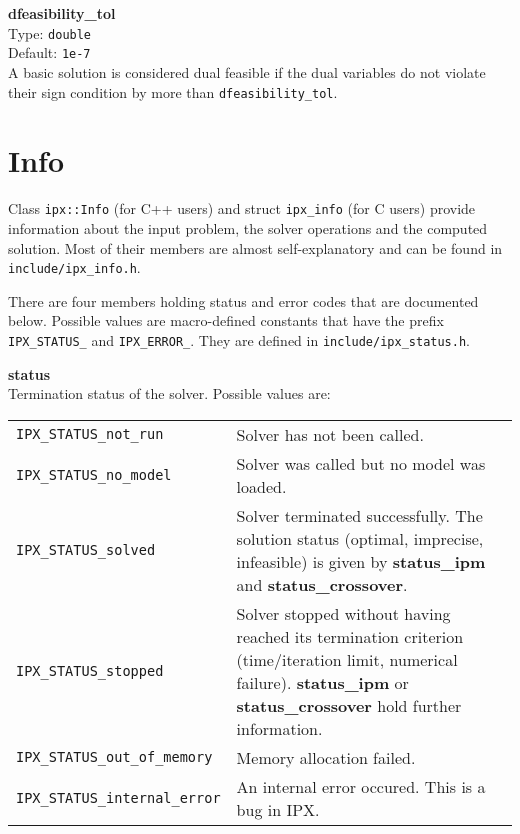 \documentclass{article}
\newcommand{\ct}{\texttt}
\newcommand{\param}[4]{
  \noindent\begin{minipage}{\textwidth}
    \textbf{#1}\\
    Type: \ct{#2}\\
    Default: \ct{#3}\\
    #4
  \end{minipage}
  \vskip 1\baselineskip
}
\newcommand{\info}[2]{
  \noindent\begin{minipage}{\textwidth}
    \textbf{#1}\\
    #2
  \end{minipage}
  \vskip 1\baselineskip
}
\begin{document}
\param{dfeasibility\_tol}{double}{1e-7}{
  A basic solution is considered dual feasible if the dual variables do not
  violate their sign condition by more than \ct{dfeasibility\_tol}.
}

\section{Info}
\label{sec:info}

Class \ct{ipx::Info} (for C++ users) and struct \ct{ipx\_info} (for C users)
provide information about the input problem, the solver operations and the
computed solution. Most of their members are almost self-explanatory and can be
found in \ct{include/ipx\_info.h}.

There are four members holding status and error codes that are documented below.
Possible values are macro-defined constants that have the prefix
\ct{IPX\_STATUS\_} and \ct{IPX\_ERROR\_}. They are defined in
\ct{include/ipx\_status.h}.\\[2em]

\info{status}{
  Termination status of the solver. Possible values are:\\[1em]
  \begin{tabular}{lp{8cm}}
    \ct{IPX\_STATUS\_not\_run} & Solver has not been called.\\
    \ct{IPX\_STATUS\_no\_model} & Solver was called but no model was loaded.\\
    \ct{IPX\_STATUS\_solved} & Solver terminated successfully. The solution
    status (optimal, imprecise, infeasible) is given by \textbf{status\_ipm} and
    \textbf{status\_crossover}.\\
    \ct{IPX\_STATUS\_stopped} & Solver stopped without having reached its
    termination criterion (time/iteration limit, numerical failure).
    \textbf{status\_ipm} or \textbf{status\_crossover} hold further
    information.\\
    \ct{IPX\_STATUS\_out\_of\_memory} & Memory allocation failed.\\
    \ct{IPX\_STATUS\_internal\_error} & An internal error occured. This is a
    bug in IPX.\\
  \end{tabular}
}
\end{document}
